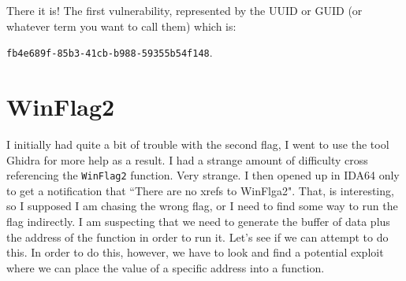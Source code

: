 \documentclass[12pt]{article}
\newcommand\tab[1][0.5cm]{\hspace*{#1}}
\begin{document}
There it is! The first vulnerability, represented by the UUID or GUID (or whatever term you want to call them) which is: 
\begin{center}
	\texttt{fb4e689f-85b3-41cb-b988-59355b54f148}.
\end{center}




\section{WinFlag2}

\tab I initially had quite a bit of trouble with the second flag, I went to use the tool Ghidra for more help as a result. 
I had a strange amount of difficulty cross referencing the \texttt{WinFlag2} function. Very strange. I then opened up in IDA64 only
to get a notification that ``There are no xrefs to WinFlga2". That, is interesting, so I supposed I am chasing the wrong flag, or I
need to find some way to run the flag indirectly. I am suspecting that we need to generate the buffer of data plus the address of the
function in order to run it. Let's see if we can attempt to do this. In order to do this, however, we have to look and find a potential exploit
where we can place the value of a specific address into a function. 
\end{document}
